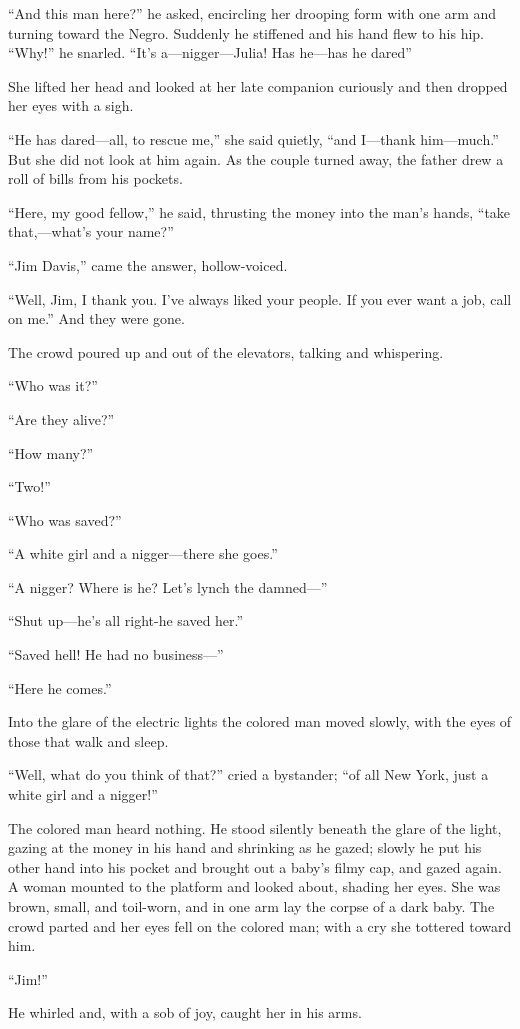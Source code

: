 ``And this man here?'' he asked, encircling her drooping form with
one arm and turning toward the Negro. Suddenly he stiffened and
his hand flew to his hip. ``Why!'' he snarled.
``It's a---nigger---Julia! Has he---has he dared''

She lifted her head and looked at her late companion curiously
and then dropped her eyes with a sigh.

``He has dared---all, to rescue me,'' she said quietly, ``and I---thank
him---much.'' But she did not look at him again. As the couple
turned away, the father drew a roll of bills from his pockets.

``Here, my good fellow,'' he said, thrusting the money into the
man's hands, ``take that,---what's your name?''

``Jim Davis,'' came the answer, hollow-voiced.

``Well, Jim, I thank you. I've always liked your people. If you
ever want a job, call on me.'' And they were gone.

The crowd poured up and out of the elevators, talking and
whispering.

``Who was it?''

``Are they alive?''

``How many?''

``Two!''

``Who was saved?''

``A white girl and a nigger---there she goes.''

``A nigger? Where is he? Let's lynch the damned---''

``Shut up---he's all right-he saved her.''

``Saved hell! He had no business---''

``Here he comes.''

Into the glare of the electric lights the colored man moved
slowly, with the eyes of those that walk and sleep.

``Well, what do you think of that?'' cried a bystander; ``of all
New York, just a white girl and a nigger!''

The colored man heard nothing. He stood silently beneath the
glare of the light, gazing at the money in his hand and
shrinking as he gazed; slowly he put his other hand into his
pocket and brought out a baby's filmy cap, and gazed again. A
woman mounted to the platform and looked about, shading her
eyes. She was brown, small, and toil-worn, and in one arm lay
the corpse of a dark baby. The crowd parted and her eyes fell on
the colored man; with a cry she tottered toward him.

``Jim!''

He whirled and, with a sob of joy, caught her in his arms.